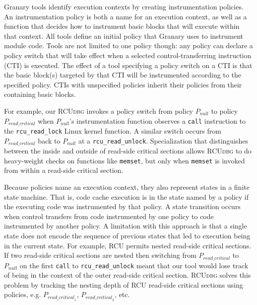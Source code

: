 \documentclass[preprint]{sigplanconf}
\newcommand{\toolname}[1]{{\scshape #1}}
\begin{document}
Granary tools identify execution contexts by creating instrumentation policies. An instrumentation policy is both a name for an execution context, as well as a function that decides how to instrument basic blocks that will execute within that context. All tools define an initial policy that Granary uses to instrument module code. Tools are not limited to one policy though: any policy can declare a policy switch that will take effect when a selected control-transferring instruction (CTI) is executed. The effect of a tool specifying a policy switch on a CTI is that the basic block(s) targeted by that CTI will be instrumented according to the specified policy. CTIs with unspecified policies inherit their policies from their containing basic blocks.

For example, our \toolname{RCUdbg} invokes a policy switch from policy $P_{\mathit{null}}$ to policy $P_{\mathit{read\_critical}}$ when $P_{\mathit{null}}$'s instrumentation function observes a \texttt{call} instruction to the \texttt{rcu\_read\_lock} Linux kernel function. A similar switch occurs from $P_{\mathit{read\_critical}}$ back to $P_{\mathit{null}}$ at a \texttt{rcu\_read\_unlock}. Specialization that distinguishes between the inside and outside of read-side critical sections allows \toolname{RCUdbg} to do heavy-weight checks on functions like \texttt{memset}, but only when \texttt{memset} is invoked from within a read-side critical section.

Because policies name an execution context, they also represent states in a finite state machine. That is, code cache execution is in the state named by a policy if the  executing code was instrumented by that policy. A state transition occurs when control transfers from code instrumented by one policy to code instrumented by another policy. A limitation with this approach is that a single state does not encode the sequence of previous states that led to execution being in the current state. For example, RCU permits nested read-side critical sections. If two read-side critical sections are nested then switching from $P_{\mathit{read\_critical}}$ to $P_{\mathit{null}}$ on the first \texttt{call} to \texttt{rcu\_read\_unlock} meant that our tool would lose track of being in the context of the outer read-side critical section.  \toolname{RCUdbg} solves this problem by tracking the nesting depth of RCU read-side critical sections using policies, e.g. $P_{\mathit{read\_critical}_1}$, $P_{\mathit{read\_critical}_2}$, etc.
\end{document}
